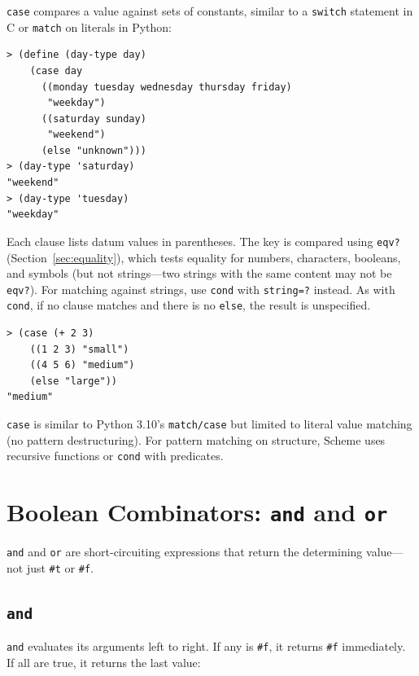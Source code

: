 \texttt{case} compares a value against sets of constants, similar to a \texttt{switch} statement in C or \texttt{match} on literals in Python:

\begin{lstlisting}[style=repl]
> (define (day-type day)
    (case day
      ((monday tuesday wednesday thursday friday)
       "weekday")
      ((saturday sunday)
       "weekend")
      (else "unknown")))
> (day-type 'saturday)
"weekend"
> (day-type 'tuesday)
"weekday"
\end{lstlisting}

Each clause lists datum values in parentheses. The key is compared using \texttt{eqv?} (Section~\ref{sec:equality}), which tests equality for numbers, characters, booleans, and symbols (but not strings---two strings with the same content may not be \texttt{eqv?}). For matching against strings, use \texttt{cond} with \texttt{string=?} instead. As with \texttt{cond}, if no clause matches and there is no \texttt{else}, the result is unspecified.

\begin{lstlisting}[style=repl]
> (case (+ 2 3)
    ((1 2 3) "small")
    ((4 5 6) "medium")
    (else "large"))
"medium"
\end{lstlisting}

\begin{note}
\texttt{case} is similar to Python 3.10's \texttt{match/case} but limited to literal value matching (no pattern destructuring). For pattern matching on structure, Scheme uses recursive functions or \texttt{cond} with predicates.
\end{note}

\section{Boolean Combinators: \texttt{and} and \texttt{or}}

\texttt{and} and \texttt{or} are short-circuiting expressions that return the determining value---not just \texttt{\#t} or \texttt{\#f}.

\subsection{\texttt{and}}

\texttt{and} evaluates its arguments left to right. If any is \texttt{\#f}, it returns \texttt{\#f} immediately. If all are true, it returns the last value:

